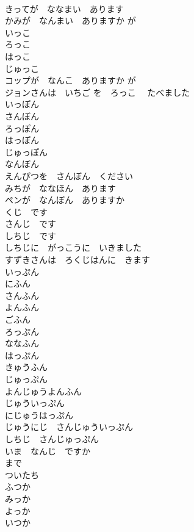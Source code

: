 \documentclass[8pt]{extreport}
\begin{document}
\begin{CJK}{UTF8}{min}
\\	きってが　ななまい　あります	
\\	かみが　なんまい　ありますか	が　
\\	いっこ	
\\	ろっこ	
\\	はっこ	
\\	じゅっこ	
\\	コップが　なんこ　ありますか	が 
\\	ジョンさんは　いちご を　ろっこ　 たべました	
\\	いっぽん	
\\	さんぼん	
\\	ろっぽん	
\\	はっぽん	
\\	じゅっぽん	
\\	なんぼん	
\\	えんぴつを　さんぼん　ください	
\\	みちが　ななほん　あります	
\\	ペンが　なんぼん　ありますか	
\\	くじ　です	
\\	さんじ　です	
\\	しちじ　です	
\\	しちじに　がっこうに　いきました	
\\	すずきさんは　ろくじはんに　きます	
\\	いっぷん	
\\	にふん	
\\	さんふん	
\\	よんふん	
\\	ごふん	
\\	ろっぷん	
\\	ななふん	
\\	はっぷん	
\\	きゅうふん	
\\	じゅっぷん	
\\	よんじゅうよんふん	
\\	じゅういっぷん	
\\	にじゅうはっぷん	
\\	じゅうにじ　さんじゅういっぷん	
\\	しちじ　さんじゅっぷん	
\\	いま　なんじ　ですか	
\\	まで	
\\	ついたち	
\\	ふつか	
\\	みっか	
\\	よっか	
\\	いつか	

\end{CJK}
\end{document}
